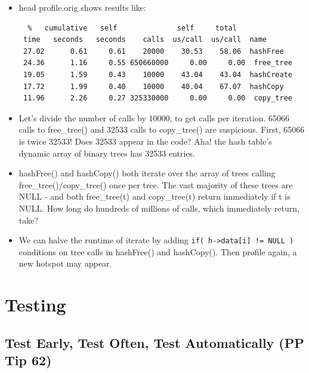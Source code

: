 \documentclass[handout]{beamer}
\newcommand{\pitem}{\pause \item}
\begin{document}
\begin{frame}[fragile]
    \begin{itemize}
    \item
      \alert{head profile.orig} shows results like:
\small
\begin{verbatim}
  %   cumulative   self              self     total
 time   seconds   seconds    calls  us/call  us/call  name
 27.02      0.61     0.61    20000    30.53    58.06  hashFree
 24.36      1.16     0.55 650660000     0.00     0.00  free_tree
 19.05      1.59     0.43    10000    43.04    43.04  hashCreate
 17.72      1.99     0.40    10000    40.04    67.07  hashCopy
 11.96      2.26     0.27 325330000     0.00     0.00  copy_tree
\end{verbatim}
    \pitem
    Let's divide the number of calls by 10000, to get calls per iteration.
    65066 calls to \alert{free\_tree()} and
    32533 calls to \alert{copy\_tree()} are suspicious.
    \pause
    First, 65066 is twice 32533!
    Does 32533 appear in the code?
    \pause
    Aha! the hash table's \alert{dynamic array of binary trees}
    has 32533 entries.
    \pitem
    \alert{hashFree()} and \alert{hashCopy()} both
    iterate over the array of trees calling \alert{free\_tree()/copy\_tree()} once per tree.
    The \alert{vast majority} of these trees are \alert{NULL} - and both
    \alert{free\_tree(t)} and \alert{copy\_tree(t)} return immediately if \alert{t} is NULL.
    \pause
    How long do hundreds of millions of calls, which immediately return, take?

    \pitem
    We can \alert{halve the runtime} of \alert{iterate} by adding
    \verb+if( h->data[i] != NULL )+ conditions on tree calls
    in \alert{hashFree()} and \alert{hashCopy()}.
    \pause
    Then profile again, a new hotspot may appear.
    \end{itemize}
\end{frame}

\section{Testing}
\subsection{Test Early, Test Often, Test Automatically (PP Tip 62)}
\end{document}
